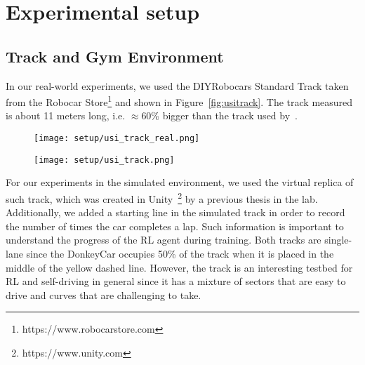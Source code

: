 \chapter{Experimental setup}


\section{Track and Gym Environment} \label{sec:track}
In our real-world experiments, we used the DIYRobocars Standard Track taken from the Robocar Store\footnote{https://www.robocarstore.com} and shown in Figure~\ref{fig:usitrack}. The track measured is about 11 meters long, i.e. $\approx$60\% bigger than the track used by~\citet{DBLP:journals/corr/abs-2008-00715}. 

\begin{figure}[h]
    \centering
\begin{minipage}{.5\textwidth}
    \centering
    \texttt{[image: setup/usi\_track\_real.png]}
    \label{fig:usitrack}
\end{minipage}%
\begin{minipage}{.5\textwidth}
    \centering
    \texttt{[image: setup/usi\_track.png]}
    \label{fig:usitracksim}
\end{minipage}
\end{figure}

For our experiments in the simulated environment, we used the virtual replica of such track, which was created in Unity~\footnote{https://www.unity.com} by a previous thesis in the lab. Additionally, we added a starting line in the simulated track in order to record the number of times the car completes a lap. Such information is important to understand the progress of the RL agent during training. Both tracks are single-lane since the DonkeyCar occupies 50\% of the track when it is placed in the middle of the yellow dashed line. However, the track is an interesting testbed for RL and self-driving in general since it has a mixture of sectors that are easy to drive and curves that are challenging to take.

